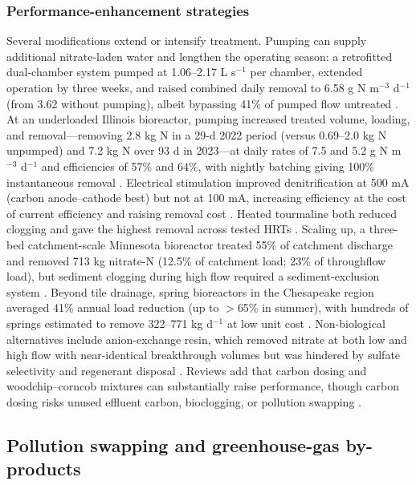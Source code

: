 \documentclass[11pt]{article}
\begin{document}
\subsubsection{Performance-enhancement strategies}

Several modifications extend or intensify treatment. Pumping can supply additional nitrate-laden water and lengthen the operating season: a retrofitted dual-chamber system pumped at 1.06--2.17 L s$^{-1}$ per chamber, extended operation by three weeks, and raised combined daily removal to 6.58 g N m$^{-3}$ d$^{-1}$ (from 3.62 without pumping), albeit bypassing 41\% of pumped flow untreated \parencite{Hartfiel2023}. At an underloaded Illinois bioreactor, pumping increased treated volume, loading, and removal---removing 2.8 kg N in a 29-d 2022 period (versus 0.69--2.0 kg N unpumped) and 7.2 kg N over 93 d in 2023---at daily rates of 7.5 and 5.2 g N m$^{-3}$ d$^{-1}$ and efficiencies of 57\% and 64\%, with nightly batching giving 100\% instantaneous removal \parencite{DíazGarcía2025}. Electrical stimulation improved denitrification at 500 mA (carbon anode--cathode best) but not at 100 mA, increasing efficiency at the cost of current efficiency and raising removal cost \parencite{Law2018}. Heated tourmaline both reduced clogging and gave the highest removal across tested HRTs \parencite{Ma2021}. Scaling up, a three-bed catchment-scale Minnesota bioreactor treated 55\% of catchment discharge and removed 713 kg nitrate-N (12.5\% of catchment load; 23\% of throughflow load), but sediment clogging during high flow required a sediment-exclusion system \parencite{Feyereisen2023}. Beyond tile drainage, spring bioreactors in the Chesapeake region averaged 41\% annual load reduction (up to $>$65\% in summer), with hundreds of springs estimated to remove 322--771 kg d$^{-1}$ at low unit cost \parencite{Easton2019}. Non-biological alternatives include anion-exchange resin, which removed nitrate at both low and high flow with near-identical breakthrough volumes but was hindered by sulfate selectivity and regenerant disposal \parencite{MAGETTE1990}. Reviews add that carbon dosing and woodchip--corncob mixtures can substantially raise performance, though carbon dosing risks unused effluent carbon, bioclogging, or pollution swapping \parencite{Wang2025b}.

\subsection{Pollution swapping and greenhouse-gas by-products}
\end{document}
